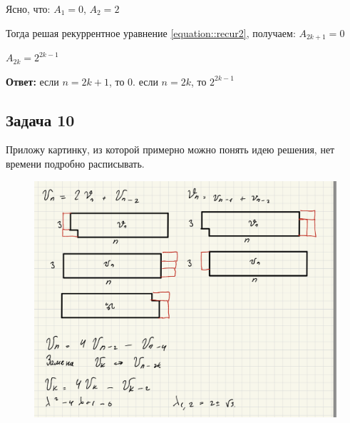 Ясно, что: $A_1 = 0$, $A_2 = 2$

Тогда решая рекуррентное уравнение \ref{equation::recur2}, получаем:
$A_{2k+1} = 0$

$A_{2k} = 2^{2k-1}$

\textbf{Ответ:} если $n = 2k + 1$, то 0. если $n = 2k$, то $2^{2k-1}$

\subsection{Задача 10}

Приложу картинку, из которой примерно можно понять идею решения, нет времени подробно расписывать.

\begin{figure}[H]
    \centering
    \includegraphics[width=0.75\linewidth]{Figures/sem06_task10.png}
\end{figure}